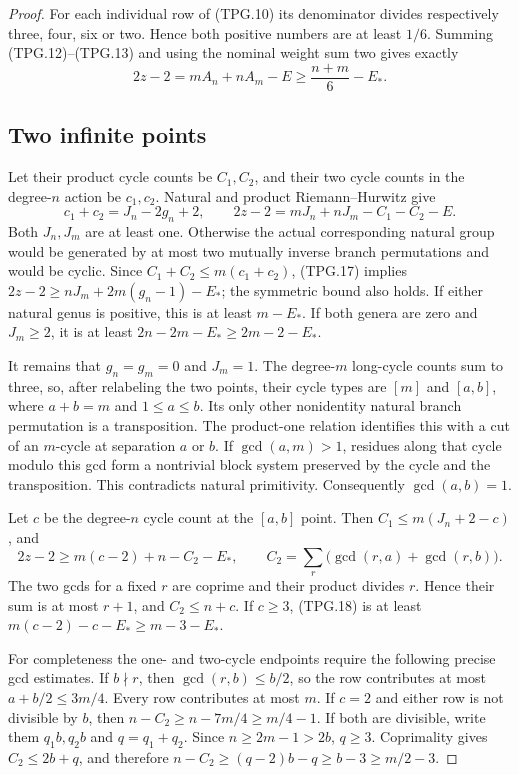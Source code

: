 \begin{proof}
For each individual row of (TPG.10) its denominator divides
respectively three, four, six or two.  Hence both positive
numbers are at least \(1/6\).  Summing (TPG.12)--(TPG.13)
and using the nominal weight sum two gives exactly
\[
             2z-2=mA_n+nA_m-E
                    \ge\frac{n+m}{6}-E_*.
 \tag{TPG.16}
\]

\subsection*{Two infinite points}

Let their product cycle counts be \(C_1,C_2\), and their
two cycle counts in the degree-\(n\) action be \(c_1,c_2\).
Natural and product Riemann--Hurwitz give
\[
 c_1+c_2=J_n-2g_n+2,\qquad
 2z-2=mJ_n+nJ_m-C_1-C_2-E.
 \tag{TPG.17}
\]
Both \(J_n,J_m\) are at least one.  Otherwise the actual
corresponding natural group would be generated by at most two
mutually inverse branch permutations and would be cyclic.
Since \(C_1+C_2\le m(c_1+c_2)\), (TPG.17) implies
\(2z-2\ge nJ_m+2m(g_n-1)-E_*\); the symmetric bound
also holds.  If either natural genus is positive, this is
at least \(m-E_*\).  If both genera are zero and
\(J_m\ge2\), it is at least \(2n-2m-E_*\ge2m-2-E_*\).

It remains that \(g_n=g_m=0\) and \(J_m=1\).  The
degree-\(m\) long-cycle counts sum to three, so, after relabeling
the two points, their cycle types are \([m]\) and \([a,b]\),
where \(a+b=m\) and \(1\le a\le b\).  Its only other
nonidentity natural branch permutation is a transposition.
The product-one relation identifies this with a cut of an
\(m\)-cycle at separation \(a\) or \(b\).
If \(\gcd(a,m)>1\), residues along that cycle modulo this
gcd form a nontrivial block system preserved by the cycle and
the transposition.  This contradicts natural primitivity.
Consequently \(\gcd(a,b)=1\).

Let \(c\) be the degree-\(n\) cycle count at the \([a,b]\)
point.  Then \(C_1\le m(J_n+2-c)\), and
\[
 2z-2\ge m(c-2)+n-C_2-E_*,\qquad
 C_2=\sum_{r}\bigl(\gcd(r,a)+\gcd(r,b)\bigr).
 \tag{TPG.18}
\]
The two gcds for a fixed \(r\) are coprime and their product
divides \(r\).  Hence their sum is at most \(r+1\), and
\(C_2\le n+c\).  If \(c\ge3\), (TPG.18) is at least
\(m(c-2)-c-E_*\ge m-3-E_*\).

For completeness the one- and two-cycle endpoints require
the following precise gcd estimates.  If \(b\nmid r\), then
\(\gcd(r,b)\le b/2\), so the row contributes at most
\(a+b/2\le3m/4\).  Every row contributes at most \(m\).
If \(c=2\) and either row is not divisible by \(b\), then
\(n-C_2\ge n-7m/4\ge m/4-1\).
If both are divisible, write them \(q_1b,q_2b\) and
\(q=q_1+q_2\).  Since \(n\ge2m-1>2b\), \(q\ge3\).
Coprimality gives \(C_2\le2b+q\), and therefore
\(n-C_2\ge(q-2)b-q\ge b-3\ge m/2-3\).


\end{proof}
